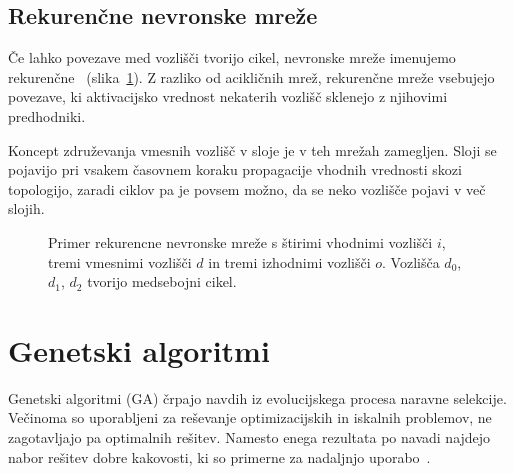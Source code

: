 \documentclass[a4paper,12pt,openright]{book}
\begin{document}
    \subsection{Rekurenčne nevronske mreže}\label{subsec:rekurencne-nevronske-mreze}
    Če lahko povezave med vozlišči tvorijo cikel, nevronske mreže imenujemo rekurenčne~\cite{recurrent_neural_network_wiki} (slika~\ref{fig:diagram-rekurencne-mreze}).
    Z razliko od acikličnih mrež, rekurenčne mreže vsebujejo povezave, ki aktivacijsko vrednost nekaterih vozlišč
    sklenejo z njihovimi predhodniki.

    Koncept združevanja vmesnih vozlišč v sloje je v teh mrežah zamegljen.
    Sloji se pojavijo pri vsakem časovnem koraku propagacije vhodnih vrednosti skozi topologijo, zaradi ciklov pa je povsem možno,
    da se neko vozlišče pojavi v več slojih.
    \begin{figure}[H]
        \begin{center}
            
        \end{center}
        \caption{Primer rekurencne nevronske mreže s štirimi vhodnimi vozlišči $i$, tremi vmesnimi vozlišči $d$ in tremi izhodnimi vozlišči $o$.
        Vozlišča $d_0$, $d_1$, $d_2$ tvorijo medsebojni cikel.}
        \label{fig:diagram-rekurencne-mreze}
    \end{figure}

    \section{Genetski algoritmi}\label{sec:genetski-algoritmi}
    Genetski algoritmi (GA) črpajo navdih iz evolucijskega procesa naravne selekcije.
    Večinoma so uporabljeni za reševanje optimizacijskih in iskalnih problemov, ne zagotavljajo pa optimalnih rešitev.
    Namesto enega rezultata po navadi najdejo nabor rešitev dobre kakovosti, ki so primerne za nadaljnjo
    uporabo~\cite{inteligentni_sistemi_2010,genetic_algorithm_wiki_2022}.
    
\end{document}
